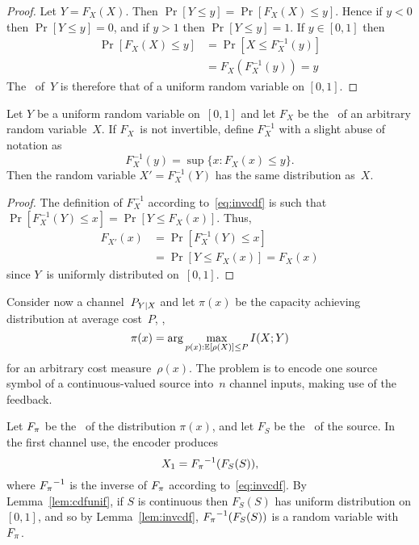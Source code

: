 \begin{proof}
  Let $Y = F_X(X)$. Then $\Pr[Y \le y] = \Pr[F_X(X) \le y]$.
  Hence if $y < 0$ then $\Pr[Y \le y] = 0$, and if $y > 1$ then $\Pr[Y \le y] =
  1$.  If $y \in [0,1]$ then
  \begin{align*}
    \Pr[F_X(X) \le y] &= \Pr[X \le F_X^{-1}(y)] \\
    &= F_X(F_X^{-1}(y)) = y
  \end{align*}
  The \cdf\ of~$Y$ is therefore that of a uniform random variable on $[0,1]$.
\end{proof}


\begin{lemma}
  \label{lem:invcdf}
  Let $Y$ be a uniform random variable on~$[0,1]$ and let $F_X$ be the \cdf\ of
  an arbitrary random variable~$X$. If $F_X$~is not invertible, define
  $F_X^{-1}$ with a slight abuse of notation as
  \begin{equation}
    \label{eq:invcdf}
    F_X^{-1}(y) = \sup \{x : F_X(x) \le y\}.
  \end{equation}
  Then the random variable $X' = F_X^{-1}(Y)$ has the same distribution as~$X$.
\end{lemma}

\begin{proof}
  The definition of $F_X^{-1}$ according to~\eqref{eq:invcdf} is such
  that $\Pr[F_X^{-1}(Y) \le x] = \Pr[Y \le F_X(x)]$. Thus,
  \begin{align*}
    F_{X'}(x) &= \Pr[F_X^{-1}(Y) \le x] \\
    &= \Pr[Y \le F_X(x)]  = F_X(x)
  \end{align*}
  since $Y$~is uniformly distributed on~$[0,1]$.
\end{proof}

Consider now a channel~$P_{Y|X}$ and let $\pi(x)$ be the capacity achieving
distribution at average cost~$P$, \ie, 
\begin{equation*}
  \pi(x) = \arg\max_{p(x): \mathbb{E}[\rho(X)] \le P} I(X;Y)
\end{equation*}
for an arbitrary cost measure~$\rho(x)$.  The problem is to encode one source
symbol of a continuous-valued source into~$n$ channel inputs, making use of the
feedback.

Let ${F_{\pi}}$ be the \cdf\ of the distribution $\pi(x)$, and let $F_S$ be the \cdf\
of the source. In the first channel use, the encoder produces
\begin{equation}
  \label{eq:posteriorx1}
  X_1 = {F_{\pi}}^{-1}(F_S(S)),
\end{equation}
where ${F_{\pi}}^{-1}$ is the inverse of ${F_{\pi}}$ according to~\eqref{eq:invcdf}. By
Lemma~\ref{lem:cdfunif}, if $S$ is continuous then $F_S(S)$ has uniform
distribution on $[0,1]$, and so by Lemma~\ref{lem:invcdf}, ${F_{\pi}}^{-1}(F_S(S))$
is a random variable with \cdf\ ${F_{\pi}}$.

